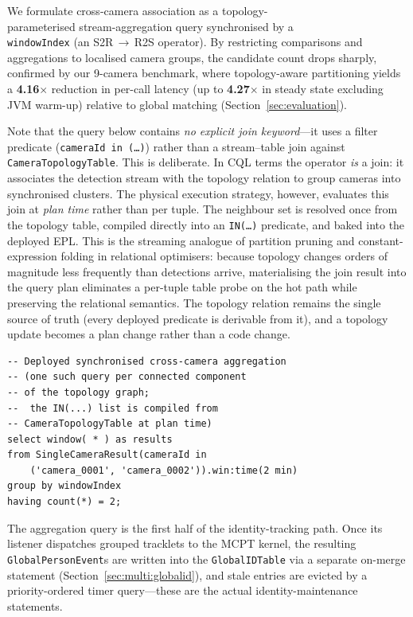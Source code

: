 \documentclass[5p,times]{elsarticle}
\begin{document}
We formulate cross-camera association as a topology-\\parameterised stream-aggregation query synchronised by a \\\texttt{windowIndex} (an S2R\,$\to$\,R2S operator). By restricting comparisons and aggregations to localised camera groups, the candidate count drops sharply, confirmed by our 9-camera benchmark, where topology-aware partitioning yields a \textbf{4.16$\times$} reduction in per-call latency (up to \textbf{4.27$\times$} in steady state excluding JVM warm-up) relative to global matching (Section~\ref{sec:evaluation}).

Note that the query below contains \emph{no explicit join keyword}---it uses a filter predicate (\texttt{cameraId in (\dots)}) rather than a stream--table join against \texttt{CameraTopologyTable}. This is deliberate. In CQL terms the operator \emph{is} a join: it associates the detection stream with the topology relation to group cameras into synchronised clusters. The physical execution strategy, however, evaluates this join at \emph{plan time} rather than per tuple. The neighbour set is resolved once from the topology table, compiled directly into an \texttt{IN(\dots)} predicate, and baked into the deployed EPL. This is the streaming analogue of partition pruning and constant-expression folding in relational optimisers: because topology changes orders of magnitude less frequently than detections arrive, materialising the join result into the query plan eliminates a per-tuple table probe on the hot path while preserving the relational semantics. The topology relation remains the single source of truth (every deployed predicate is derivable from it), and a topology update becomes a plan change rather than a code change.
{\small
\begin{verbatim}
-- Deployed synchronised cross-camera aggregation
-- (one such query per connected component 
-- of the topology graph;
--  the IN(...) list is compiled from 
-- CameraTopologyTable at plan time)
select window( * ) as results
from SingleCameraResult(cameraId in
    ('camera_0001', 'camera_0002')).win:time(2 min)
group by windowIndex
having count(*) = 2;
\end{verbatim}
}
The aggregation query is the first half of the identity-tracking path. Once its listener dispatches grouped tracklets to the MCPT kernel, the resulting \texttt{GlobalPersonEvent}s are written into the \texttt{GlobalIDTable} via a separate on-merge statement (Section~\ref{sec:multi:globalid}), and stale entries are evicted by a priority-ordered timer query---these are the actual identity-maintenance statements.
\end{document}

